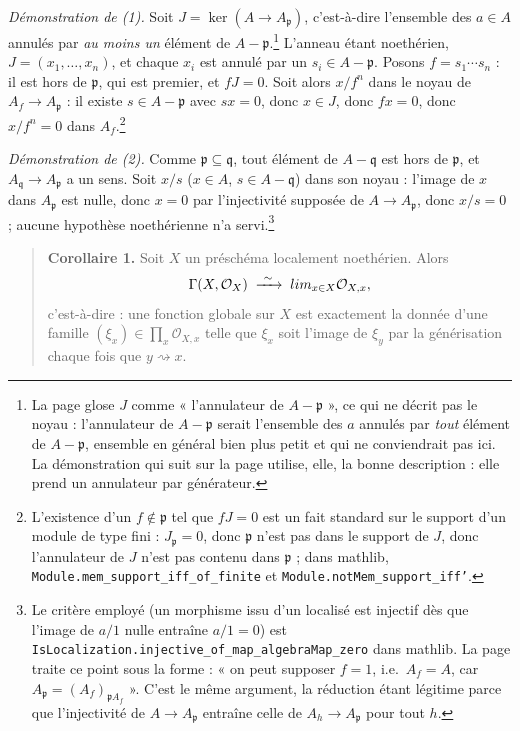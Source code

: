 \documentclass[11pt,a4paper]{article}
\begin{document}
\emph{Démonstration de (1).} Soit $J = \ker(A \to A_{\mathfrak p})$,
c'est-à-dire l'ensemble des $a \in A$ annulés par \emph{au moins un} élément
de $A - \mathfrak p$.\footnote{La page glose $J$ comme « l'annulateur de
$A - \mathfrak p$ », ce qui ne décrit pas le noyau : l'annulateur de
$A - \mathfrak p$ serait l'ensemble des $a$ annulés par \emph{tout} élément de
$A - \mathfrak p$, ensemble en général bien plus petit et qui ne conviendrait
pas ici. La démonstration qui suit sur la page utilise, elle, la bonne
description : elle prend un annulateur par générateur.} L'anneau étant
noethérien, $J = (x_1, \dots, x_n)$, et chaque $x_i$ est annulé par un
$s_i \in A - \mathfrak p$. Posons $f = s_1 \cdots s_n$ : il est hors de
$\mathfrak p$, qui est premier, et $fJ = 0$. Soit alors $x/f^n$ dans le noyau
de $A_f \to A_{\mathfrak p}$ : il existe $s \in A - \mathfrak p$ avec
$sx = 0$, donc $x \in J$, donc $fx = 0$, donc $x/f^n = 0$ dans
$A_f$.\footnote{L'existence d'un $f \notin \mathfrak p$ tel que
$fJ = 0$ est un fait standard sur le support d'un module de type fini :
$J_{\mathfrak p} = 0$, donc $\mathfrak p$ n'est pas dans le support de $J$,
donc l'annulateur de $J$ n'est pas contenu dans $\mathfrak p$ ; dans mathlib,
\texttt{Module.mem\_support\_iff\_of\_finite} et
\texttt{Module.notMem\_support\_iff'}.}

\emph{Démonstration de (2).} Comme $\mathfrak p \subseteq \mathfrak q$, tout
élément de $A - \mathfrak q$ est hors de $\mathfrak p$, et
$A_{\mathfrak q} \to A_{\mathfrak p}$ a un sens. Soit $x/s$ ($x \in A$,
$s \in A - \mathfrak q$) dans son noyau : l'image de $x$ dans $A_{\mathfrak p}$
est nulle, donc $x = 0$ par l'injectivité supposée de $A \to A_{\mathfrak p}$,
donc $x/s = 0$ ; aucune hypothèse noethérienne n'a servi.\footnote{Le
critère employé (un morphisme issu d'un localisé est injectif dès que
l'image de $a/1$ nulle entraîne $a/1 = 0$) est
\texttt{IsLocalization.injective\_of\_map\_algebraMap\_zero} dans
mathlib. La page traite ce point sous la forme : « on peut
supposer $f = 1$, i.e.\ $A_f = A$, car $A_{\mathfrak p} =
(A_f)_{\mathfrak p A_f}$ ». C'est le même argument, la réduction étant
légitime parce que l'injectivité de $A \to A_{\mathfrak p}$ entraîne celle de
$A_h \to A_{\mathfrak p}$ pour tout $h$.}

\begin{quote}
\textbf{Corollaire 1.} Soit $X$ un préschéma localement noethérien. Alors
\[ \Gamma(X, \mathcal{O}_X) \;\xrightarrow{\ \sim\ }\;
   \varprojlim_{x \in X} \mathcal{O}_{X,x}, \]
c'est-à-dire : une fonction globale sur $X$ est exactement la donnée d'une
famille $(\xi_x) \in \prod_x \mathcal{O}_{X,x}$ telle que $\xi_x$ soit
l'image de $\xi_y$ par la générisation chaque fois que
$y \rightsquigarrow x$.
\end{quote}
\end{document}
